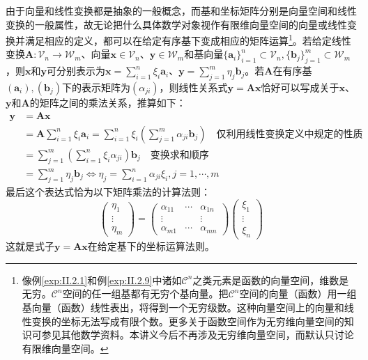 \documentclass[main.tex]{subfiles}
\begin{document}
由于向量和线性变换都是抽象的一般概念，而基和坐标矩阵分别是向量空间和线性变换的一般属性，故无论把什么具体数学对象视作有限维向量空间的向量或线性变换并满足相应的定义，都可以在给定有序基下变成相应的矩阵运算\footnote{像例\ref{exp:II.2.1}和例\ref{exp:II.2.9}中诸如$\mathcal{C}^n$之类元素是函数的向量空间，维数是无穷。$\mathcal{C}^n$空间的任一组基都有无穷个基向量。把$\mathcal{C}^n$空间的向量（函数）用一组基向量（函数）线性表出，将得到一个无穷级数。这种向量空间上的向量和线性变换的坐标无法写成有限个数。更多关于函数空间作为无穷维向量空间的知识可参见其他数学资料\cite{Hassani1999}。本讲义今后不再涉及无穷维向量空间，而默认只讨论有限维向量空间。}。若给定线性变换$\mathbf{A}:\mathcal{V}_n\rightarrow\mathcal{W}_m$、向量$\mathbf{x}\in\mathcal{V}_n$、$\mathbf{y}\in\mathcal{W}_m$和基向量$\{\mathbf{a}_i\}_{i=1}^n\subset\mathcal{V}_n,\{\mathbf{b}_j\}_{j=1}^m\subset\mathcal{W}_m$，则$\mathbf{x}$和$\mathbf{y}$可分别表示为$\mathbf{x}=\sum_{i=1}^n\xi_i\mathbf{a}_i$、$\mathbf{y}=\sum_{j=1}^m\eta_j\mathbf{b}_j$。若$\mathbf{A}$在有序基$\left(\mathbf{a}_i\right),\left(\mathbf{b}_j\right)$下的表示矩阵为$\left(\alpha_{ji}\right)$，则线性关系式$\mathbf{y}=\mathbf{Ax}$恰好可以写成关于$\mathbf{x}$、$\mathbf{y}$和$\mathbf{A}$的矩阵之间的乘法关系，推算如下：
\begin{equation*}
    \begin{split}
        \mathbf{y} & =\mathbf{Ax}                                                                                                                          \\
                   & =\mathbf{A}\sum_{i=1}^n\xi_i\mathbf{a}_i=\sum_{i=1}^n\xi_i\left(\sum_{j=1}^m\alpha_{ji}\mathbf{b}_j\right)\quad\text{仅利用线性变换定义中规定的性质} \\
                   & =\sum_{j=1}^m\left(\sum_{i=1}^n\xi_i\alpha_{ji}\right)\mathbf{b}_j\quad\text{变换求和顺序}                                                  \\
                   & =\sum_{j=1}^m\eta_j\mathbf{b}_j\Leftrightarrow\eta_j      =\sum_{i=1}^n\alpha_{ji}\xi_i,j=1,\cdots,m
    \end{split}
\end{equation*}
最后这个表达式恰为以下矩阵乘法的计算法则：
\[\left(\begin{array}{ccc}\eta_1\\\vdots\\\eta_m\end{array}\right)=\left(\begin{array}{ccc}\alpha_{11}&\cdots&\alpha_{1n}\\\vdots&&\vdots\\\alpha_{m1}&\cdots&\alpha_{mn}\end{array}\right)\left(\begin{array}{ccc}\xi_1\\\vdots\\\xi_n\end{array}\right)\]
这就是式子$\mathbf{y}=\mathbf{Ax}$在给定基下的坐标运算法则。
\end{document}
